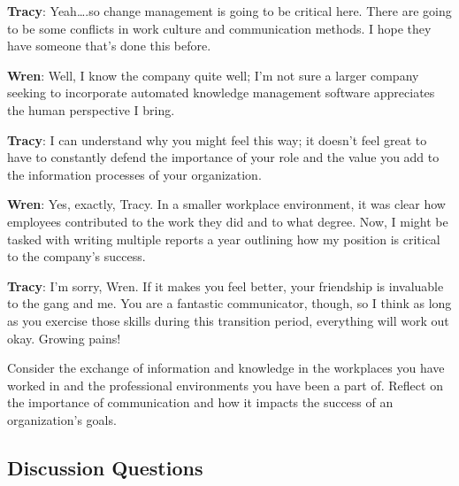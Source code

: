 \documentclass[
  letterpaper,
  DIV=11,
  numbers=noendperiod]{scrreprt}
\begin{document}
\textbf{Tracy}: Yeah\ldots.so change management is going to be critical
here. There are going to be some conflicts in work culture and
communication methods. I hope they have someone that's done this before.

\textbf{Wren}: Well, I know the company quite well; I'm not sure a
larger company seeking to incorporate automated knowledge management
software appreciates the human perspective I bring.

\textbf{Tracy}: I can understand why you might feel this way; it doesn't
feel great to have to constantly defend the importance of your role and
the value you add to the information processes of your organization.

\textbf{Wren}: Yes, exactly, Tracy. In a smaller workplace environment,
it was clear how employees contributed to the work they did and to what
degree. Now, I might be tasked with writing multiple reports a year
outlining how my position is critical to the company's success.

\textbf{Tracy}: I'm sorry, Wren. If it makes you feel better, your
friendship is invaluable to the gang and me. You are a fantastic
communicator, though, so I think as long as you exercise those skills
during this transition period, everything will work out okay. Growing
pains!

Consider the exchange of information and knowledge in the workplaces you
have worked in and the professional environments you have been a part
of. Reflect on the importance of communication and how it impacts the
success of an organization's goals.

\subsection{Discussion Questions}\label{discussion-questions-2}
\end{document}
